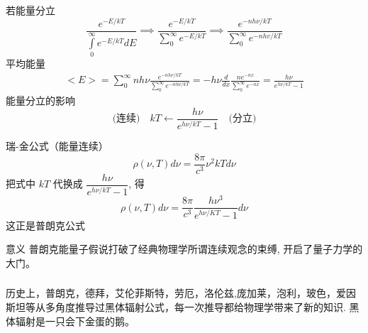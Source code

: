 \begin{frame}
    \frametitle{}
    {\Bullet} 若能量分立   
    \begin{equation*}
        \frac{e^{-E / k T}}{\int\limits_{0}^{\infty} e^{-E / k T} d E} 
        \implies \frac{e^{-E / k T}}{\sum\limits_{0}^{\infty} e^{-E / k T}} 
        \implies \frac{e^{-nh\nu / k T}}{\sum\limits_{0}^{\infty} e^{-nhv / k T}} 
    \end{equation*}    
    平均能量
    \begin{equation*}
        \begin{split}
            <E> = \sum\limits_{0}^{\infty} nh\nu\frac{e^{-nh\nu / k T}}{\sum\limits_{0}^{\infty} e^{-nh\nu / k T}} 
            = -h\nu \frac{d}{dx} \frac{n e^{-nx}}{\sum\limits_{0}^{\infty} e^{-nx}} 
            = \frac{h\nu}{e^{h\nu/kT}-1} 
        \end{split} 
    \end{equation*}
    能量分立的影响
    \begin{equation*}
        \text{(连续)} \quad k T \leftarrow \frac{h \nu}{e^{ h \nu / k T}-1} \quad \text{(分立)} 
    \end{equation*}
\end{frame}

\begin{frame}
    瑞-金公式（能量连续）
    \begin{equation*}
        \rho(\nu, T) d \nu=\frac{8 \pi}{c^{3}} \nu^{2} k T d \nu 
    \end{equation*}
    把式中 $kT$ 代换成 $\dfrac{h \nu}{e^{ h \nu / k T}-1}$, 得
    \begin{equation*}
        \rho(\nu, T) d \nu=\frac{8 \pi}{c^{3}} \frac{h \nu^{3}}{e^{h \nu / K T}-1} d \nu
    \end{equation*}
    这正是普朗克公式
\end{frame}

\begin{frame}
    \begin{atcbox}{意义}
        普朗克能量子假说打破了经典物理学所谓连续观念的束缚, 开启了量子力学的大门。 
    \end{atcbox}
\end{frame}

\begin{frame}
    \frametitle{}
    \centering
    \begin{atcbox}{}
        历史上，普朗克，德拜，艾伦菲斯特，劳厄，洛伦兹,庞加莱，泡利，玻色，爱因斯坦等从多角度推导过黑体辐射公式，每一次推导都给物理学带来了新的知识.  黑体辐射是一只会下金蛋的鹅。
    \end{atcbox}
\end{frame}

